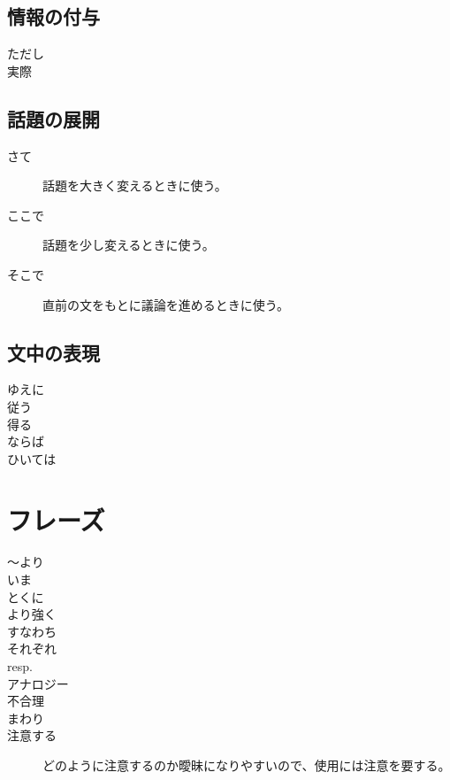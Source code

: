 \documentclass[report]{jlreq}
\begin{document}
\subsection{情報の付与}

\begin{description}
    \item[ただし]
    \item[実際]
\end{description}

\subsection{話題の展開}

\begin{description}
    \item[さて]
        話題を大きく変えるときに使う。
    \item[ここで]
        話題を少し変えるときに使う。
    \item[そこで]
        直前の文をもとに議論を進めるときに使う。
\end{description}

\subsection{文中の表現}

\begin{description}
    \item[ゆえに]
    \item[従う]
    \item[得る]
    \item[ならば]
    \item[ひいては]
\end{description}

%
\section{フレーズ}

\begin{description}
    \item[〜より]
    \item[いま]
    \item[とくに]
    \item[より強く]
    \item[すなわち]
    \item[それぞれ]
    \item[resp.]
    \item[アナロジー]
    \item[不合理]
    \item[まわり]
    \item[注意する]
        どのように注意するのか曖昧になりやすいので、使用には注意を要する。
\end{description}
\end{document}
